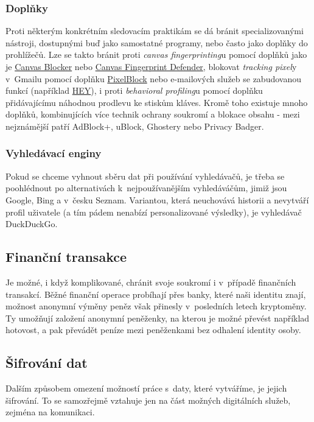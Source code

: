 \subsubsection*{Doplňky}
Proti některým konkrétním sledovacím praktikám se dá bránit specializovanými nástroji, dostupnými buď jako samostatné programy, nebo často jako doplňky do prohlížečů.
Lze se takto bránit proti \textit{canvas fingerprinting}u pomocí doplňků jako je \href{https://chrome.google.com/webstore/detail/canvas-blocker-fingerprin/nomnklagbgmgghhjidfhnoelnjfndfpd?hl=en}{Canvas Blocker} nebo \href{https://chrome.google.com/webstore/detail/canvas-fingerprint-defend/lanfdkkpgfjfdikkncbnojekcppdebfp?hl=en}{Canvas Fingerprint Defender}, blokovat \textit{tracking pixel}y v~Gmailu pomocí doplňku \href{https://chrome.google.com/webstore/detail/pixelblock/jmpmfcjnflbcoidlgapblgpgbilinlem?hl=en}{PixelBlock} nebo e-mailových služeb se zabudovanou funkcí (například \href{https://hey.com}{HEY}), i proti \textit{behavioral profiling}u pomocí doplňku přidávajícímu náhodnou prodlevu ke stiskům kláves.
Kromě toho existuje mnoho doplňků, kombinujících více technik ochrany soukromí a blokace obsahu - mezi nejznámější patří AdBlock+, uBlock, Ghostery nebo Privacy Badger.

\subsubsection*{Vyhledávací enginy}
Pokud se chceme vyhnout sběru dat při používání vyhledávačů, je třeba se poohlédnout po alternativách k~nejpoužívanějším vyhledáváčům, jimiž jsou Google, Bing a v~česku Seznam. Variantou, která neuchovává historii a nevytváří profil uživatele (a tím pádem nenabízí personalizované výsledky), je vyhledávač DuckDuckGo.

\subsection{Finanční transakce}
Je možné, i když komplikované, chránit svoje soukromí i v~případě finančních transakcí. Běžné finanční operace probíhají přes banky, které naši identitu znají, možnost anonymní výměny peněz však přinesly v~posledních letech kryptoměny. Ty umožňují založení anonymní peněženky, na kterou je možné převést například hotovost, a pak převádět peníze mezi peněženkami bez odhalení identity osoby.


\subsection{Šifrování dat}
Dalším způsobem omezení možností práce s~daty, které vytváříme, je jejich šifrování. To se samozřejmě vztahuje jen na část možných digitálních služeb, zejména na komunikaci.
